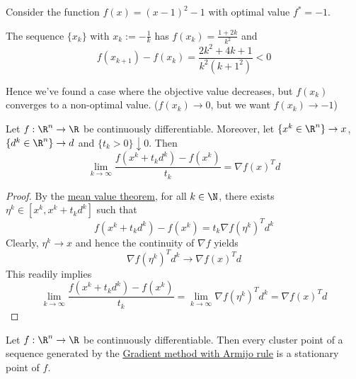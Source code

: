 \label{ae7f42d}

Consider the function $f(x)=(x-1)^2-1$ with optimal value $f^*=-1$.

The sequence $\{x_k\}$ with $x_k:=-\frac1k$ has
$f(x_k)=\frac{1+2k}{k^2}$ and
$$
	f(x_{k+1})-f(x_k)=\frac{2k^2+4k+1}{k^2(k+1^2)}<0
$$

Hence we've found a case where the objective value decreases, but
$f(x_k)$ converges to a non-optimal value. ($f(x_k)\to0$, but we want
$f(x_k)\to-1$)

\label{f8e1f12}

Let $f:\R^n\to\R$ be continuously differentiable. Moreover, let
$\{x^k\in\R^n\}\to x$, $\{d^k\in\R^n\}\to d$ and
$\{t_k>0\}\downarrow0$. Then
$$
	\lim_{k\to\infty}\frac{f(x^k+t_kd^k)-f(x^k)}{t_k}=\nabla f(x)^Td
$$

\begin{proof}
	By the \href{d37aa2b}{mean value theorem}, for all $k\in\N$, there
	exists $\eta^k\in[x^k,x^k+t_kd^k]$ such that
	$$
		f(x^k+t_kd^k)-f(x^k)=t_k\nabla f(\eta^k)^Td^k
	$$
	Clearly, $\eta^k\to x$ and hence the continuity of $\nabla f$ yields
	$$
		\nabla f(\eta^k)^Td^k\to\nabla f(x)^Td
	$$
	This readily implies
	$$
		\lim_{k\to\infty}\frac{f(x^k+t_kd^k)-f(x^k)}{t_k}=
		\lim_{k\to\infty}\nabla f(\eta^k)^Td^k=
		\nabla f(x)^Td
	$$
\end{proof}

\label{bbb25cd}

Let $f:\R^n\to\R$ be continuously differentiable. Then every cluster
point of a sequence generated by the \href{ae01f6d}{Gradient method
	with Armijo rule} is a stationary point of $f$.

